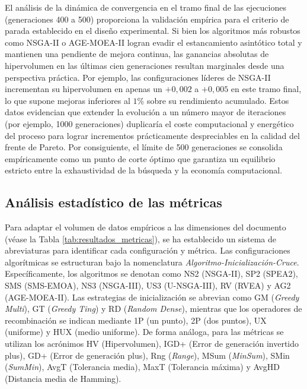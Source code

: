 El análisis de la dinámica de convergencia en el tramo final de las ejecuciones (generaciones 400 a 500) proporciona la validación empírica para el criterio de parada establecido en el diseño experimental. Si bien los algoritmos más robustos como NSGA-II o AGE-MOEA-II logran evadir el estancamiento asintótico total y mantienen una pendiente de mejora continua, las ganancias absolutas de hipervolumen en las últimas cien generaciones resultan marginales desde una perspectiva práctica. Por ejemplo, las configuraciones líderes de NSGA-II incrementan su hipervolumen en apenas un $+0{,}002$ a $+0{,}005$ en este tramo final, lo que supone mejoras inferiores al $1$\% sobre su rendimiento acumulado. Estos datos evidencian que extender la evolución a un número mayor de iteraciones (por ejemplo, 1000 generaciones) duplicaría el coste computacional y energético del proceso para lograr incrementos prácticamente despreciables en la calidad del frente de Pareto. Por consiguiente, el límite de 500 generaciones se consolida empíricamente como un punto de corte óptimo que garantiza un equilibrio estricto entre la exhaustividad de la búsqueda y la economía computacional.

\subsection{Análisis estadístico de las métricas}

Para adaptar el volumen de datos empíricos a las dimensiones del documento (véase la Tabla \ref{tab:resultados_metricas}), se ha establecido un sistema de abreviaturas para identificar cada configuración y métrica. Las configuraciones algorítmicas se estructuran bajo la nomenclatura \textit{Algoritmo-Inicialización-Cruce}. Específicamente, los algoritmos se denotan como NS2 (NSGA-II), SP2 (SPEA2), SMS (SMS-EMOA), NS3 (NSGA-III), US3 (U-NSGA-III), RV (RVEA) y AG2 (AGE-MOEA-II). Las estrategias de inicialización se abrevian como GM (\textit{Greedy Multi}), GT (\textit{Greedy Ting}) y RD (\textit{Random Dense}), mientras que los operadores de recombinación se indican mediante 1P (un punto), 2P (dos puntos), UX (uniforme) y HUX (medio uniforme). De forma análoga, para las métricas se utilizan los acrónimos HV (Hipervolumen), IGD+ (Error de generación invertido plus), GD+ (Error de generación plus), Rng (\textit{Range}), MSum (\textit{MinSum}), SMin (\textit{SumMin}), AvgT (Tolerancia media), MaxT (Tolerancia máxima) y AvgHD (Distancia media de Hamming).

